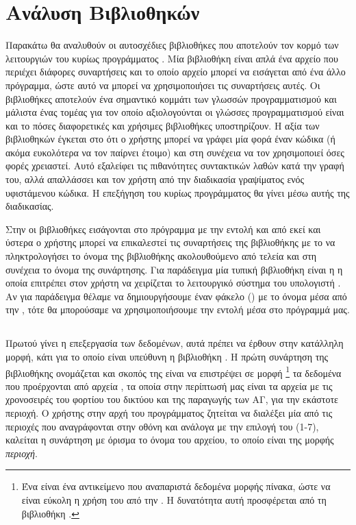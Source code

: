 \documentclass[12pt]{report}
\begin{document}
\pagebreak
\section{Ανάλυση Βιβλιοθηκών}
Παρακάτω θα αναλυθούν οι αυτοσχέδιες βιβλιοθήκες που αποτελούν τον κορμό των λειτουργιών του κυρίως προγράμματος {}. Μία βιβλιοθήκη είναι απλά ένα αρχείο {} που περιέχει διάφορες συναρτήσεις 
και το οποίο αρχείο μπορεί να εισάγεται από ένα άλλο πρόγραμμα, ώστε αυτό να μπορεί να χρησιμοποιήσει τις συναρτήσεις αυτές. Οι βιβλιοθήκες αποτελούν ένα σημαντικό κομμάτι των γλωσσών προγραμματισμού και μάλιστα ένας τομέας
για τον οποίο αξιολογούνται οι γλώσσες προγραμματισμού είναι και το πόσες διαφορετικές και χρήσιμες βιβλιοθήκες υποστηρίζουν. Η αξία των βιβλιοθηκών έγκεται στο ότι ο χρήστης
μπορεί να γράφει μία φορά έναν κώδικα (ή ακόμα ευκολότερα να τον παίρνει έτοιμο) και στη συνέχεια να τον χρησιμοποιεί όσες φορές χρειαστεί. Αυτό εξαλείφει τις πιθανότητες συντακτικών λαθών κατά την γραφή του, 
αλλά απαλλάσσει και τον χρήστη από την διαδικασία γραψίματος ενός υφιστάμενου κώδικα. Η επεξήγηση του κυρίως προγράμματος {} θα γίνει μέσω αυτής της διαδικασίας. 

Στην {} οι βιβλιοθήκες εισάγονται στο πρόγραμμα με την εντολή {} και από εκεί και ύστερα ο χρήστης μπορεί να επικαλεστεί τις συναρτήσεις της βιβλιοθήκης με το να πληκτρολογήσει το όνομα της
βιβλιοθήκης ακολουθούμενο από τελεία και στη συνέχεια το όνομα της συνάρτησης. Για παράδειγμα μία τυπική βιβλιοθήκη είναι η {} η οποία επιτρέπει στον χρήστη να χειρίζεται το λειτουργικό σύστημα του υπολογιστή
{}. Αν για παράδειγμα θέλαμε να δημιουργήσουμε έναν φάκελο ({}) με το όνομα {} μέσα από την {}, τότε θα μπορούσαμε να χρησιμοποιήσουμε την 
εντολή {\em{{}}} μέσα στο πρόγραμμά μας. 

\subsection{{}}
Πρωτού γίνει η επεξεργασία των δεδομένων, αυτά πρέπει να έρθουν στην κατάλληλη μορφή, κάτι για το οποίο είναι υπεύθυνη η βιβλιοθήκη {}. Η πρώτη συνάρτηση της βιβλιοθήκης ονομάζεται 
{\textbf{{}}} και σκοπός της είναι να επιστρέψει σε μορφή {}\footnote{Ένα {} είναι ένα αντικείμενο που αναπαριστά δεδομένα μορφής πίνακα, ώστε να είναι εύκολη η χρήση 
του από την {}. Η δυνατότητα αυτή προσφέρεται από τη βιβλιοθήκη {}.} τα δεδομένα που προέρχονται από αρχεία {}, τα οποία στην περίπτωσή μας είναι τα αρχεία με τις χρονοσειρές 
του φορτίου του δικτύου και της παραγωγής των ΑΓ, για την εκάστοτε περιοχή. Ο χρήστης στην αρχή του προγράμματος ζητείται να διαλέξει μία από τις περιοχές που αναγράφονται στην οθόνη και ανάλογα με την επιλογή του (1-7), καλείται η 
συνάρτηση με όρισμα το όνομα του αρχείου, το οποίο είναι της μορφής \textit{περιοχή}{}.
\end{document}
